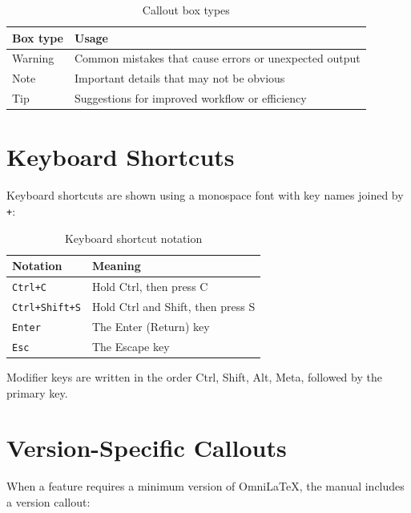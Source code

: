 \begin{table}[htbp]
    \centering
    \caption{Callout box types}
    \label{tab:callout-types}
    \begin{tabular}{@{}lp{}@{}}
        \toprule
        \textbf{Box type} & \textbf{Usage} \\
        \midrule
        Warning & Common mistakes that cause errors or unexpected output \\
        Note    & Important details that may not be obvious \\
        Tip     & Suggestions for improved workflow or efficiency \\
        \bottomrule
    \end{tabular}
\end{table}

\section{Keyboard Shortcuts}

Keyboard shortcuts are shown using a monospace font with key names joined
by \texttt{+}:

\begin{table}[htbp]
    \centering
    \caption{Keyboard shortcut notation}
    \label{tab:keyboard-notation}
    \begin{tabular}{@{}ll@{}}
        \toprule
        \textbf{Notation} & \textbf{Meaning} \\
        \midrule
        \texttt{Ctrl+C}   & Hold Ctrl, then press C \\
        \texttt{Ctrl+Shift+S} & Hold Ctrl and Shift, then press S \\
        \texttt{Enter}    & The Enter (Return) key \\
        \texttt{Esc}      & The Escape key \\
        \bottomrule
    \end{tabular}
\end{table}

Modifier keys are written in the order Ctrl, Shift, Alt, Meta, followed
by the primary key.

\section{Version-Specific Callouts}

When a feature requires a minimum version of OmniLaTeX, the manual
includes a version callout:

